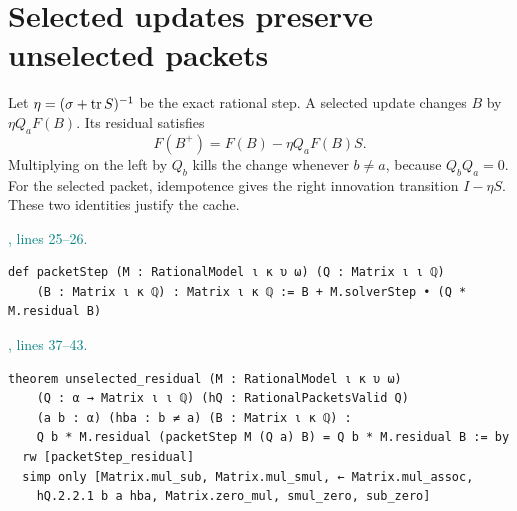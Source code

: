 \documentclass[11pt]{article}\usepackage{needspace}\renewcommand{\paperkind}{Lean companion}\setlength{\parskip}{0.35em}
\begin{document}
\section{Selected updates preserve unselected packets}

Let $\eta=(\sigma+\operatorname{tr} S)^{-1}$ be the exact rational step. A selected update changes $B$ by $\eta Q_aF(B)$. Its residual satisfies
\[
 F(B^+)=F(B)-\eta Q_aF(B)S.
\]
Multiplying on the left by $Q_b$ kills the change whenever $b\ne a$, because $Q_bQ_a=0$. For the selected packet, idempotence gives the right innovation transition $I-\eta S$. These two identities justify the cache.



{\small\textcolor{teal}{, lines 25--26.}\par}

\begin{lstlisting}[style=BayesSource]
def packetStep (M : RationalModel ι κ υ ω) (Q : Matrix ι ι ℚ)
    (B : Matrix ι κ ℚ) : Matrix ι κ ℚ := B + M.solverStep • (Q * M.residual B)
\end{lstlisting}



{\small\textcolor{teal}{, lines 37--43.}\par}

\begin{lstlisting}[style=BayesSource]
theorem unselected_residual (M : RationalModel ι κ υ ω)
    (Q : α → Matrix ι ι ℚ) (hQ : RationalPacketsValid Q)
    (a b : α) (hba : b ≠ a) (B : Matrix ι κ ℚ) :
    Q b * M.residual (packetStep M (Q a) B) = Q b * M.residual B := by
  rw [packetStep_residual]
  simp only [Matrix.mul_sub, Matrix.mul_smul, ← Matrix.mul_assoc,
    hQ.2.2.1 b a hba, Matrix.zero_mul, smul_zero, sub_zero]
\end{lstlisting}

\end{document}

